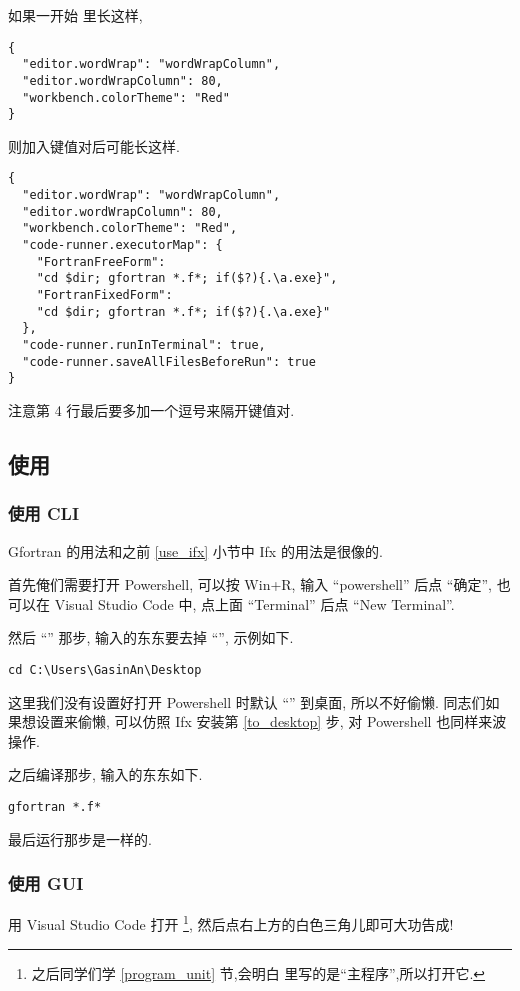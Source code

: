 如果一开始  里长这样,
\begin{verbatim}
{
  "editor.wordWrap": "wordWrapColumn",
  "editor.wordWrapColumn": 80,
  "workbench.colorTheme": "Red"
}
\end{verbatim}
则加入键值对后可能长这样.
\begin{verbatim}
{
  "editor.wordWrap": "wordWrapColumn",
  "editor.wordWrapColumn": 80,
  "workbench.colorTheme": "Red",
  "code-runner.executorMap": {
    "FortranFreeForm":
    "cd $dir; gfortran *.f*; if($?){.\a.exe}",
    "FortranFixedForm":
    "cd $dir; gfortran *.f*; if($?){.\a.exe}"
  },
  "code-runner.runInTerminal": true,
  "code-runner.saveAllFilesBeforeRun": true
}
\end{verbatim}
注意第 4 行最后要多加一个逗号来隔开键值对.

\subsection{使用}\label{use_gfortran}

\subsubsection{使用 CLI}

Gfortran 的用法和之前 \ref{use_ifx} 小节中 Ifx 的用法是很像的.

首先俺们需要打开 Powershell, 可以按 Win+R, 输入 ``powershell'' 后点 ``确定'', 也可以在 Visual Studio Code 中, 点上面 ``Terminal'' 后点 ``New Terminal''.

然后 ``'' 那步, 输入的东东要去掉 ``'', 示例如下.
\begin{verbatim}
cd C:\Users\GasinAn\Desktop
\end{verbatim}
这里我们没有设置好打开 Powershell 时默认 ``'' 到桌面, 所以不好偷懒. 同志们如果想设置来偷懒, 可以仿照 Ifx 安装第 \ref{to_desktop} 步, 对 Powershell 也同样来波操作.

之后编译那步, 输入的东东如下.
\begin{verbatim}
gfortran *.f*
\end{verbatim}

最后运行那步是一样的.

\subsubsection{使用 GUI}

用 Visual Studio Code 打开 \footnote{之后同学们学 \ref{program_unit} 节,会明白  里写的是``主程序'',所以打开它.}, 然后点右上方的白色三角儿即可大功告成!
